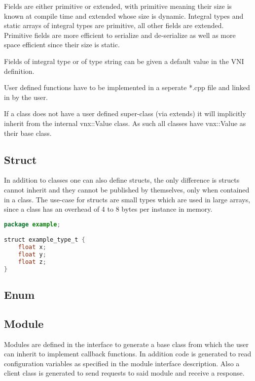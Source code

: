 \documentclass[10pt,a4paper]{report}
\begin{document}
Fields are either primitive or extended, with primitive meaning their size is known at compile time and extended whose size is dynamic. Integral types and static arrays of integral types are primitive, all other fields are extended. Primitive fields are more efficient to serialize and de-serialize as well as more space efficient since their size is static.

Fields of integral type or of type string can be given a default value in the VNI definition.

User defined functions have to be implemented in a seperate *.cpp file and linked in by the user.

If a class does not have a user defined super-class (via extends) it will implicitly inherit from the internal vnx::Value class. As such all classes have vnx::Value as their base class.

\subsection{Struct}

In addition to classes one can also define structs, the only difference is structs cannot inherit and they cannot be published by themselves, only when contained in a class. The use-case for structs are small types which are used in large arrays, since a class has an overhead of 4 to 8 bytes per instance in memory.

\begin{lstlisting}[language=Java, caption=example\_type\_t.vni]
package example;

struct example_type_t {
	float x;
	float y;
	float z;
}
\end{lstlisting}

\subsection{Enum}



\subsection{Module}

Modules are defined in the interface to generate a base class from which the user can inherit to implement callback functions. In addition code is generated to read configuration variables as specified in the module interface description. Also a client class is generated to send requests to said module and receive a response.
\end{document}
